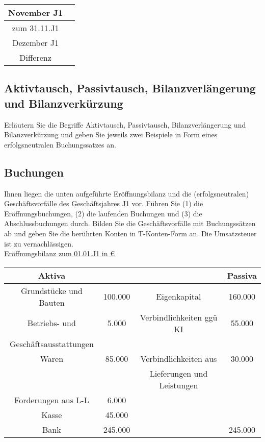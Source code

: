 \documentclass[paper=a4, fontsize=11pt]{scrartcl}
\numberwithin{equation}{section}
\numberwithin{figure}{section}
\numberwithin{table}{section}
\begin{document}
\begin{tabular}{c|c}
\hline
November J1 & \\
\hline
zum 31.11.J1 & \\
\hline
Dezember J1 & \\
\hline
Differenz & \\
\hline
\end{tabular}


\subsection{Aktivtausch, Passivtausch, Bilanzverlängerung und Bilanzverkürzung}

Erläutern Sie die Begriffe Aktivtausch, Passivtausch, Bilanzverlängerung und Bilanzverkürzung und geben Sie jeweils zwei Beispiele in Form eines erfolgsneutralen Buchungssatzes an. \\


\subsection{Buchungen}

Ihnen liegen die unten aufgeführte Eröffnungsbilanz und die (erfolgsneutralen) Geschäftsvorfälle des Geschäftsjahres J1 vor. Führen Sie (1) die Eröffnungsbuchungen, (2) die laufenden Buchungen und (3) die Abschlussbuchungen durch. Bilden Sie die Geschäftsvorfälle mit Buchungssätzen ab und geben Sie die berührten Konten in T-Konten-Form an. Die Umsatzsteuer ist zu vernachlässigen. \\

\underline{Eröffnungsbilanz zum 01.01.J1 in €}

\begin{tabular}{cc|cc}
\hline
Aktiva & &&  Passiva \\
\hline
Grundstücke und Bauten & 100.000 & Eigenkapital & 160.000 \\
Betriebs- und & 5.000 & Verbindlichkeiten ggü KI & 55.000 \\
Geschäftsausstattungen & & & \\
Waren & 85.000 & Verbindlichkeiten aus & 30.000 \\
 & & Lieferungen und Leistungen & \\
 Forderungen aus L-L & 6.000 & & \\
 Kasse & 45.000 & & \\
 Bank & 245.000 & & 245.000 \\
 \hline
\end{tabular}
\\
\end{document}
